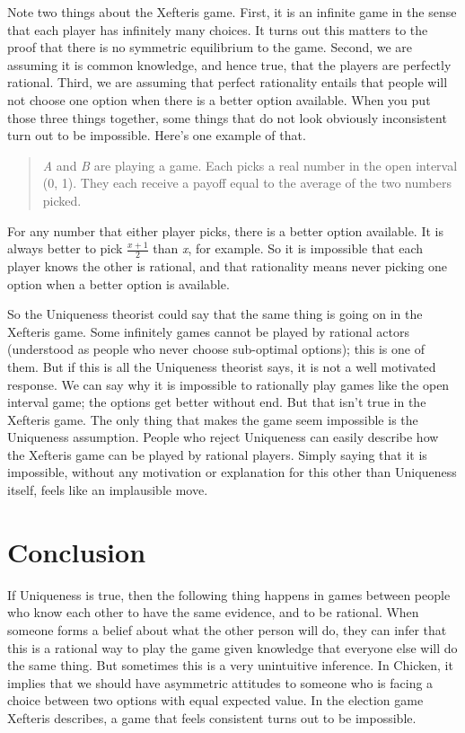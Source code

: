 \documentclass[
  12pt,
  letterpaper,
  DIV=11,
  numbers=noendperiod]{scrreprt}
\begin{document}
Note two things about the Xefteris game. First, it is an infinite game
in the sense that each player has infinitely many choices. It turns out
this matters to the proof that there is no symmetric equilibrium to the
game. Second, we are assuming it is common knowledge, and hence true,
that the players are perfectly rational. Third, we are assuming that
perfect rationality entails that people will not choose one option when
there is a better option available. When you put those three things
together, some things that do not look obviously inconsistent turn out
to be impossible. Here's one example of that.

\begin{quote}
\emph{A} and \emph{B} are playing a game. Each picks a real number in
the open interval (0, 1). They each receive a payoff equal to the
average of the two numbers picked.
\end{quote}

For any number that either player picks, there is a better option
available. It is always better to pick \(\frac{x+1}{2}\) than \emph{x},
for example. So it is impossible that each player knows the other is
rational, and that rationality means never picking one option when a
better option is available.

So the Uniqueness theorist could say that the same thing is going on in
the Xefteris game. Some infinitely games cannot be played by rational
actors (understood as people who never choose sub-optimal options); this
is one of them. But if this is all the Uniqueness theorist says, it is
not a well motivated response. We can say why it is impossible to
rationally play games like the open interval game; the options get
better without end. But that isn't true in the Xefteris game. The only
thing that makes the game seem impossible is the Uniqueness assumption.
People who reject Uniqueness can easily describe how the Xefteris game
can be played by rational players. Simply saying that it is impossible,
without any motivation or explanation for this other than Uniqueness
itself, feels like an implausible move.

\hypertarget{conclusion}{%
\section{Conclusion}\label{conclusion}}

If Uniqueness is true, then the following thing happens in games between
people who know each other to have the same evidence, and to be
rational. When someone forms a belief about what the other person will
do, they can infer that this is a rational way to play the game given
knowledge that everyone else will do the same thing. But sometimes this
is a very unintuitive inference. In Chicken, it implies that we should
have asymmetric attitudes to someone who is facing a choice between two
options with equal expected value. In the election game Xefteris
describes, a game that feels consistent turns out to be impossible.
\end{document}
